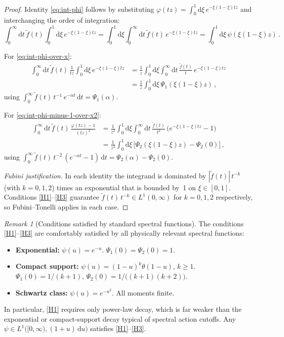 \documentclass[11pt,a4paper]{article}
\renewcommand{\dd}{\mathrm{d}}
\theoremstyle{definition}
\theoremstyle{remark}
\newtheorem{remark}[theorem]{Remark}
\begin{document}
\begin{proof}
Identity \eqref{eq:int-phi} follows by substituting
$\varphi(tz) = \int_0^1 \dd\xi\,e^{-\xi(1-\xi)tz}$ and
interchanging the order of integration:
\begin{equation*}
  \int_0^\infty \dd t\,\tilde{f}(t)
  \int_0^1 \dd\xi\,e^{-\xi(1-\xi)tz}
  = \int_0^1 \dd\xi \int_0^\infty \dd t\,\tilde{f}(t)\,
  e^{-\xi(1-\xi)tz}
  = \int_0^1 \dd\xi\,\psi(\xi(1-\xi)z)\,.
\end{equation*}

For \eqref{eq:int-phi-over-x}:
\begin{align*}
  \int_0^\infty \dd t\,\tilde{f}(t)\,\frac{1}{tz}
  \int_0^1 \dd\xi\,e^{-\xi(1-\xi)tz}
  &= \frac{1}{z}\int_0^1 \dd\xi
  \int_0^\infty \dd t\,\frac{\tilde{f}(t)}{t}\,
  e^{-\xi(1-\xi)tz}\\
  &= \frac{1}{z}\int_0^1 \dd\xi\,\Psi_1(\xi(1-\xi)z)\,,
\end{align*}
using $\int_0^\infty \tilde{f}(t)\,t^{-1}\,e^{-\alpha t}\,\dd t
= \Psi_1(\alpha)$.

For \eqref{eq:int-phi-minus-1-over-x2}:
\begin{align*}
  \int_0^\infty \dd t\,\tilde{f}(t)\,
  \frac{\varphi(tz)-1}{(tz)^2}
  &= \frac{1}{z^2}\int_0^1 \dd\xi
  \int_0^\infty \dd t\,\frac{\tilde{f}(t)}{t^2}\,
  \bigl(e^{-\xi(1-\xi)tz} - 1\bigr)\\
  &= \frac{1}{z^2}\int_0^1 \dd\xi\,\bigl[
  \Psi_2(\xi(1-\xi)z) - \Psi_2(0)\bigr]\,,
\end{align*}
using $\int_0^\infty \tilde{f}(t)\,t^{-2}\,(e^{-\alpha t}-1)\,\dd t
= \Psi_2(\alpha) - \Psi_2(0)$.

\smallskip\noindent
\emph{Fubini justification.}\;  In each identity the integrand is dominated
by $|\tilde{f}(t)|\,t^{-k}$ (with $k=0,1,2$) times an exponential
that is bounded by~1 on $\xi\in[0,1]$.  Conditions
\ref{H1}--\ref{H3} guarantee $\tilde{f}(t)\,t^{-k}\in L^1(0,\infty)$
for $k=0,1,2$ respectively, so Fubini--Tonelli applies in each case.
\end{proof}

\begin{remark}[Conditions satisfied by standard spectral functions]
\label{rem:convergence-examples}
The conditions \ref{H1}--\ref{H3} are comfortably satisfied by all
physically relevant spectral functions:
\begin{itemize}[nosep]
\item \textbf{Exponential:} $\psi(u) = e^{-u}$. \;
  $\Psi_1(0) = \Psi_2(0) = 1$.
\item \textbf{Compact support:} $\psi(u) = (1-u)^k\theta(1-u)$, $k \ge 1$. \;
  $\Psi_1(0) = 1/(k+1)$, $\Psi_2(0) = 1/\bigl((k+1)(k+2)\bigr)$.
\item \textbf{Schwartz class:} $\psi(u) = e^{-u^2}$. \;
  All moments finite.
\end{itemize}
In particular, \ref{H1} requires only power-law decay, which is
far weaker than the exponential or compact-support decay typical of
spectral action cutoffs.  Any $\psi \in L^1\bigl([0,\infty),
(1+u)\,\dd u\bigr)$ satisfies \ref{H1}--\ref{H3}.
\end{remark}
\end{document}
